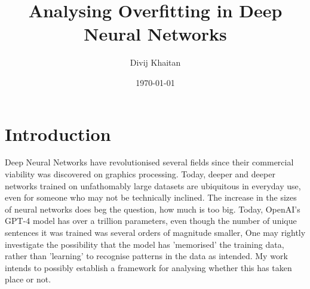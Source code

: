 \documentclass{article}
\title{Analysing Overfitting in Deep Neural Networks}
\author{Divij Khaitan}
\date{\today}
\begin{document}
    \maketitle

    \section{Introduction}
        Deep Neural Networks have revolutionised several fields since their commercial viability was discovered on graphics processing. Today, deeper and deeper networks trained on unfathomably large datasets are ubiquitous in everyday use, even for someone who may not be technically inclined. The increase in the sizes of neural networks does beg the question, how much is too big. Today, OpenAI's GPT-4 model has over a trillion parameters, even though the number of unique sentences it was trained was several orders of magnitude smaller,
        One may rightly investigate the possibility that the model has 'memorised' the training data, rather than 'learning' to recognise patterns in the data as intended. My work intends to possibly establish a framework for analysing whether this has taken place or not.
\end{document}
